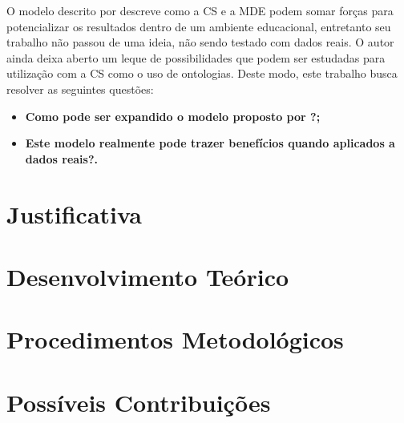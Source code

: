 \documentclass[
	oneside,
	12pt,				%
	a4paper,			%
	english,			%
	brazil,				%
	article
	]{abntex2}
\begin{document}
O modelo descrito por  descreve como a CS e a MDE podem somar forças para potencializar os resultados dentro de um ambiente educacional, entretanto seu trabalho não passou de uma ideia, não sendo testado com dados reais. O autor ainda deixa aberto um leque de possibilidades que podem ser estudadas para utilização com a CS como o uso de ontologias. Deste modo, este trabalho busca resolver as seguintes questões:

\begin{itemize}	
	\item \textbf{Como pode ser expandido o modelo proposto por ?;}
	\item \textbf{Este modelo realmente pode trazer benefícios quando aplicados a dados reais?.}	 
\end{itemize}

\section{Justificativa}

\section{Desenvolvimento Teórico}

\section{Procedimentos Metodológicos}

\section{Possíveis Contribuições}




\end{document}
